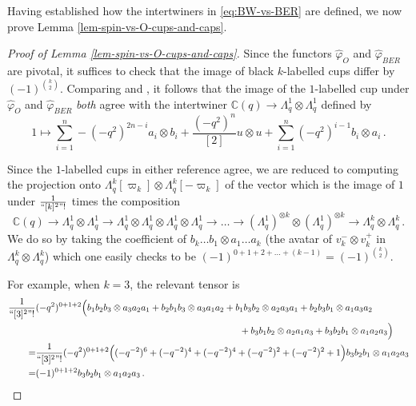 \documentclass[10pt]{amsart}
\numberwithin{equation}{section}
\theoremstyle{definition}
\let\hat=\widehat
\def\C{{\mathbb C}}
\begin{document}
Having established how the intertwiners in \eqref{eq:BW-vs-BER} are defined, we now prove Lemma \ref{lem-spin-vs-O-cups-and-caps}. 

\begin{proof}[Proof of Lemma \ref{lem-spin-vs-O-cups-and-caps}]
Since the functors $\hat{\varphi}_{O}$ and $\hat{\varphi}_{BER}$ are pivotal, 
it suffices to check that the image of black $k$-labelled cups differ by $(-1)^{\binom{k}{2}}$.
Comparing \cite[Definition 3.69]{BodWu} and \cite[Proposition 4.14]{BER}, 
it follows that the image of the $1$-labelled cup under $\hat{\varphi}_{O}$ and $\hat{\varphi}_{BER}$ \emph{both} agree 
with the intertwiner $\C(q)\rightarrow \Lambda_q^1\otimes \Lambda_q^1$ defined by
\[
1\mapsto \sum_{i=1}^{n} -(-q^2)^{2n-i}a_i\otimes b_i + \frac{(-q^2)^n}{[2]}u\otimes u + \sum_{i=1}^{n} (-q^2)^{i-1}b_i\otimes a_i \, .
\]

Since the $1$-labelled cups in either reference agree, 
we are reduced to computing the projection onto $\Lambda_q^k[\varpi_k]\otimes \Lambda_q^k[-\varpi_k]$ 
of the vector which is the image of $1$ under $\frac{1}{``[k]^2"!}$ times the composition
\[
\C(q)\rightarrow \Lambda_q^1\otimes \Lambda_q^1 \rightarrow 
	\Lambda_q^1\otimes \Lambda_q^1 \otimes \Lambda_q^1 \otimes \Lambda_q^1 \rightarrow \dots 
		\rightarrow (\Lambda_q^1)^{\otimes k}\otimes (\Lambda_q^1)^{\otimes k} \rightarrow \Lambda_q^k\otimes \Lambda_q^k \, .
\]
We do so by taking the coefficient of $b_k\dots b_1\otimes a_1\dots a_k$ (the avatar of $v_k^-\otimes v_k^+$ in $\Lambda_q^k\otimes \Lambda_q^k$) 
which one easily checks to be $(-1)^{0+1+2 + \dots + (k-1)} = (-1)^{\binom{k}{2}}$.

For example, when $k=3$, 
the relevant tensor is
\begin{align*}
\frac{1}{``[3]^2"!}&(-q^2)^{0+1+2}
\Big(b_1b_2b_3\otimes a_3a_2a_1 + b_2b_1b_3\otimes a_3a_1a_2 + b_1b_3b_2\otimes a_2a_3a_1 + b_2b_3b_1\otimes a_1a_3a_2 \\
		& \qquad \qquad \qquad \qquad \qquad \qquad \qquad \qquad 
			\qquad \qquad \qquad + b_3b_1b_2\otimes a_2a_1a_3 + b_3b_2b_1\otimes a_1a_2a_3\Big) \\
	=&\frac{1}{``[3]^2"!}(-q^2)^{0+1+2}\Big((-q^{-2})^6 + (-q^{-2})^4 +(-q^{-2})^4 + (-q^{-2})^2 + (-q^{-2})^2 + 1 \Big)
		b_3b_2b_1\otimes a_1a_2a_3 \\
	=&(-1)^{0+1+2}b_3b_2b_1\otimes a_1a_2a_3 \, . \qedhere
\end{align*}

\end{proof}
\end{document}
